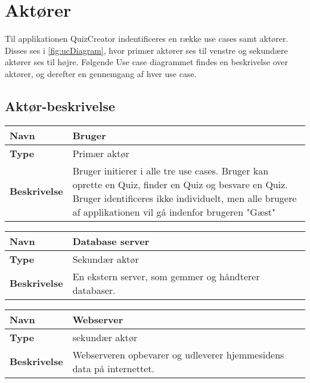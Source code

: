 \section{Aktører}

Til applikationen QuizCreator indentificeres en række use cases samt aktører. Disses ses i \ref{fig:ucDiagram}, hvor primær aktører ses til venstre og sekundære aktører ses til højre. Følgende Use case diagrammet findes en beskrivelse over aktører, og derefter en gennemgang af hver use case. 


\subsection{Aktør-beskrivelse}

\begin{tabular}{|p{2cm}|p{12cm}|}

\hline 
\textbf{Navn} & Bruger \\ 
\hline 
\textbf{Type} & Primær aktør \\ 
\hline 
\textbf{Beskrivelse} & Bruger initierer i alle tre use cases. Bruger kan oprette en Quiz, finder en Quiz og besvare en Quiz. Bruger identificeres ikke individuelt, men alle brugere af applikationen vil gå indenfor brugeren "Gæst"\\ 
\hline 

\end{tabular} 

\begin{tabular}{|p{2cm}|p{12cm}|}

\hline 
\textbf{Navn} & Database server \\ 
\hline 
\textbf{Type} & Sekundær aktør \\ 
\hline 
\textbf{Beskrivelse} & En ekstern server, som gemmer og håndterer databaser.\\ 
\hline 

\end{tabular} 

\begin{tabular}{|p{2cm}|p{12cm}|}

\hline 
\textbf{Navn} & Webserver \\ 
\hline 
\textbf{Type} & sekundær aktør \\ 
\hline 
\textbf{Beskrivelse} & Webserveren opbevarer og udleverer hjemmesidens data på internettet.\\ 
\hline 

\end{tabular} 